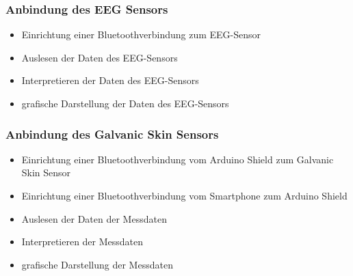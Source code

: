 \documentclass[10pt, a4paper, oneside, titlepage]{scrartcl} %
\begin{document}
	\subsubsection{Anbindung des EEG Sensors}
	\begin{itemize}
	\item{}Einrichtung einer Bluetoothverbindung zum EEG-Sensor
	\item{}Auslesen der Daten des EEG-Sensors
	\item{}Interpretieren der Daten des EEG-Sensors
	\item{}grafische Darstellung der Daten des EEG-Sensors
	\end{itemize}
	\subsubsection{Anbindung des Galvanic Skin Sensors}
	\begin{itemize}
	\item{}Einrichtung einer Bluetoothverbindung vom Arduino Shield zum Galvanic Skin Sensor
	\item{}Einrichtung einer Bluetoothverbindung vom Smartphone zum Arduino Shield
	\item{}Auslesen der Daten der Messdaten
	\item{}Interpretieren der Messdaten
	\item{}grafische Darstellung der Messdaten
	\end{itemize}
   	

	\newpage
\end{document}
